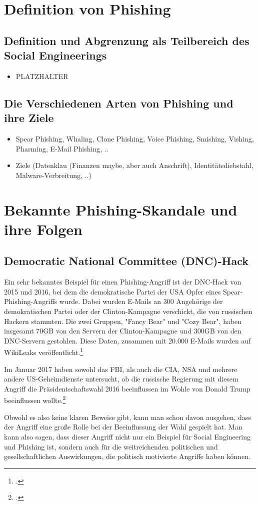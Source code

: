 \documentclass[12pt, a4paper, oneside]{scrartcl}
\begin{document}
\section{Definition von Phishing}

\subsection{Definition und Abgrenzung als Teilbereich des Social Engineerings}
\begin{itemize}
  \item PLATZHALTER
\end{itemize}


\subsection{Die Verschiedenen Arten von Phishing und ihre Ziele}
\begin{itemize}
  \item Spear Phishing, Whaling, Clone Phishing, Voice Phishing, Smishing, Vishing, Pharming, E-Mail Phishing, ..
  \item Ziele (Datenklau (Finanzen maybe, aber auch Anschrift), Identitätsdiebstahl, Malware-Verbreitung, ..)
\end{itemize}

\section{Bekannte Phishing-Skandale und ihre Folgen}

\subsection{Democratic National Committee (DNC)-Hack}
Ein sehr bekanntes Beispiel für einen Phishing-Angriff ist der DNC-Hack von 2015 und 2016, 
bei dem die demokratische Partei der USA Opfer eines Spear-Phishing-Angriffs wurde. 
Dabei wurden E-Mails an 300 Angehörige der demokratischen Partei oder der Clinton-Kampagne
verschickt, die von russischen Hackern stammten. Die zwei Gruppen, "Fancy Bear" und "Cozy Bear",
haben insgesamt 70GB von den Servern der Clinton-Kampagne und 300GB von den DNC-Servern gestohlen.
Diese Daten, zusammen mit 20.000 E-Mails wurden auf WikiLeaks veröffentlicht.\footcite{IDStrong_DNC}
\par
Im Januar 2017 haben sowohl das FBI, als auch die CIA, NSA und mehrere andere US-Geheimdienste
untersucht, ob die russische Regierung mit diesem Angriff die Präsidentschaftswahl 2016 beeinflussen 
im Wohle von Donald Trump beeinflussen wollte.\footcite{NYT_DNC}
\par
Obwohl es also keine klaren Beweise gibt, kann man schon davon ausgehen, dass der Angriff eine 
große Rolle bei der Beeinflussung der Wahl gespielt hat. Man kann also sagen, dass dieser Angriff 
nicht nur ein Beispiel für Social Engineering und Phishing ist, sondern auch für die weitreichenden 
politischen und gesellschaftlichen Auswirkungen, die politisch motivierte Angriffe haben können.
\end{document}
